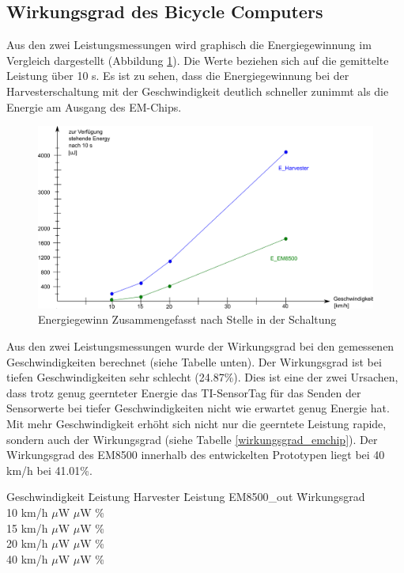 \subsection{Wirkungsgrad des Bicycle Computers}

Aus den zwei Leistungsmessungen wird graphisch die Energiegewinnung im Vergleich dargestellt (Abbildung \ref{zsmEnergyGewinn}). Die Werte beziehen sich auf die gemittelte Leistung über 10 s. Es ist zu sehen, dass die Energiegewinnung bei der Harvesterschaltung mit der Geschwindigkeit deutlich schneller zunimmt als die Energie am Ausgang des EM-Chips. 

\begin{figure}[ht]
    \includegraphics[width=1\textwidth]{4Resultate/imag/EnergyGewinnNachStelle.png} 
    \caption{Energiegewinn Zusammengefasst nach Stelle in der Schaltung}
    \label{zsmEnergyGewinn}
\end{figure}

Aus den zwei Leistungsmessungen wurde der Wirkungsgrad bei den gemessenen Geschwindigkeiten berechnet (siehe Tabelle unten). Der Wirkungsgrad ist bei tiefen Geschwindigkeiten sehr schlecht (24.87\thinspace\%). Dies ist eine der zwei Ursachen, dass trotz genug geernteter Energie das TI-SensorTag für das Senden der Sensorwerte bei tiefer Geschwindigkeiten nicht wie erwartet genug Energie hat. Mit mehr Geschwindigkeit erhöht sich nicht nur die geerntete Leistung rapide, sondern auch der Wirkungsgrad (siehe Tabelle \ref{wirkungsgrad_emchip}). Der Wirkungsgrad des EM8500 innerhalb des entwickelten Prototypen liegt bei 40 km/h  bei 41.01\thinspace\%.  

\begin{minipage}{\textwidth}
    \begin{tabbing}
    \label{wirkungsgrad_emchip}
        Geschwindigkeit \quad\= Leistung Harvester \quad\= Leistung EM8500\_out \quad\= Wirkungsgrad\\[0.8ex]
        10 km/h    $\mu$W    $\mu$W \thinspace\%  \\
        15 km/h    $\mu$W   $\mu$W \thinspace\%  \\
        20 km/h  $\mu$W   $\mu$W \thinspace\%  \\
        40 km/h  $\mu$W  $\mu$W \thinspace\%  \\
    \end{tabbing}
\end{minipage}  


